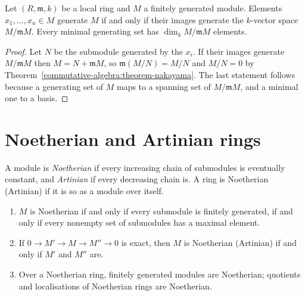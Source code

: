 \begin{corollary}\label{commutative-algebra:corollary-nakayama-generators}
Let $(R, \mathfrak{m}, k)$ be a local ring and $M$ a finitely generated module. Elements $x_1, \ldots, x_n \in M$ generate $M$
if and only if their images generate the $k$-vector space $M/\mathfrak{m}M$. Every minimal generating set has
$\dim_k M/\mathfrak{m}M$ elements.
\end{corollary}

\begin{proof}
Let $N$ be the submodule generated by the $x_i$. If their images generate $M/\mathfrak{m}M$ then $M = N + \mathfrak{m}M$, so
$\mathfrak{m}(M/N) = M/N$ and $M/N = 0$ by Theorem~\ref{commutative-algebra:theorem-nakayama}. The last statement follows
because a generating set of $M$ maps to a spanning set of $M/\mathfrak{m}M$, and a minimal one to a basis.
\end{proof}

\section{Noetherian and Artinian rings}\label{commutative-algebra:section-noetherian}

\begin{definition}\label{commutative-algebra:definition-noetherian}
A module is \emph{Noetherian} if every increasing chain of submodules is eventually constant, and
\emph{Artinian} if every decreasing chain is. A ring is Noetherian (Artinian) if it is so as a module over
itself.
\end{definition}

\begin{proposition}\label{commutative-algebra:proposition-noetherian}
\begin{enumerate}
\item $M$ is Noetherian if and only if every submodule is finitely generated, if and only if every nonempty set
of submodules has a maximal element.
\item If $0 \to M' \to M \to M'' \to 0$ is exact, then $M$ is Noetherian (Artinian) if and only if $M'$ and $M''$ are.
\item Over a Noetherian ring, finitely generated modules are Noetherian; quotients and localisations of Noetherian
rings are Noetherian.
\end{enumerate}
\end{proposition}

